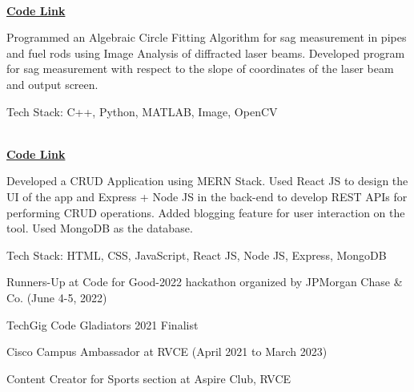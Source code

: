 \documentclass[a4paper]{MagicalCV}
\begin{document}
\begin{minipage}[t]{0.66\textwidth}
 \\
\vspace{\topsep} %
\href{https://github.com/satviktiwari/Minor-Project}{\bf Code Link} 
\begin{tightemize}
\item Programmed an Algebraic Circle Fitting Algorithm for sag measurement in pipes and fuel rods using Image Analysis of diffracted laser beams. Developed program for sag measurement with
respect to the slope of coordinates of the laser beam and output screen.
\item Tech Stack: C++, Python, MATLAB, Image, OpenCV
\end{tightemize}
\sectionsep

 \\
\vspace{\topsep} %
\href{https://github.com/satviktiwari/CRUD-Application}{\bf Code Link}
\begin{tightemize}
\item Developed a CRUD Application using MERN Stack. Used React JS to design the UI of the app and Express + Node JS in the back-end to develop REST APIs for performing CRUD operations. Added blogging feature for user interaction on the tool. Used MongoDB as the database.
\item Tech Stack: HTML, CSS, JavaScript, React JS, Node JS, Express, MongoDB
\end{tightemize}
\sectionsep

\vspace{\topsep} %
\begin{tightemize} 
\item Runners-Up at Code for Good-2022 hackathon organized by JPMorgan Chase \& Co. (June 4-5, 2022)
\item TechGig Code Gladiators 2021 Finalist
\item Cisco Campus Ambassador at RVCE (April 2021 to March 2023)
\item Content Creator for Sports section at Aspire Club, RVCE
\end{tightemize}
\sectionsep


\end{minipage} 
\end{document}
